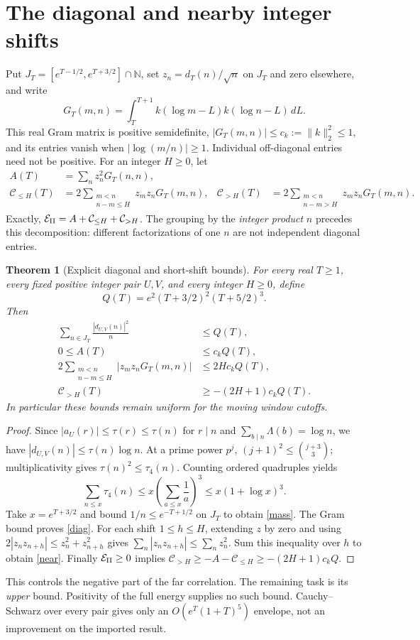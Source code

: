 \documentclass[11pt]{article}
\newtheorem{theorem}{Theorem}\newtheorem{lemma}{Lemma}\newtheorem{proposition}{Proposition}
\newcommand{\dd}{\,d}\newcommand{\E}{\mathcal E}\newcommand{\C}{\mathcal C}
\begin{document}
\section{The diagonal and nearby integer shifts}
Put $J_T=[e^{T-1/2},e^{T+3/2}]\cap\mathbb N$, set
$z_n=d_T(n)/\sqrt n$ on $J_T$ and zero elsewhere, and write
\[
 G_T(m,n)=\int_T^{T+1}k(\log m-L)k(\log n-L)\dd L.
\]
This real Gram matrix is positive semidefinite,
$|G_T(m,n)|\le c_k:=\|k\|_2^2\le1$, and its entries vanish when
$|\log(m/n)|\ge1$. Individual off-diagonal entries need not be positive.
For an integer $H\ge0$, let
\begin{align*}
 A(T)&=\sum_n z_n^2G_T(n,n),\\
 \C_{\le H}(T)&=2\sum_{\substack{m<n\\n-m\le H}}z_mz_nG_T(m,n),&
 \C_{>H}(T)&=2\sum_{\substack{m<n\\n-m>H}}z_mz_nG_T(m,n).
\end{align*}
Exactly, $\E_{\rm II}=A+\C_{\le H}+\C_{>H}$. The grouping by the
\emph{integer product} $n$ precedes this decomposition: different
factorizations of one $n$ are not independent diagonal entries.

\begin{theorem}[Explicit diagonal and short-shift bounds]\label{band}
For every real $T\ge1$, every fixed positive integer pair $U,V$, and
every integer $H\ge0$, define
\[
 Q(T)=e^2(T+3/2)^2(T+5/2)^3.
\]
Then
\begin{align}
 \sum_{n\in J_T}\frac{|d_{U,V}(n)|^2}{n}&\le Q(T),\label{mass}\\
 0\le A(T)&\le c_k Q(T),\label{diag}\\
 2\sum_{\substack{m<n\\n-m\le H}}|z_mz_nG_T(m,n)|
 &\le 2Hc_k Q(T),\label{near}\\
 \C_{>H}(T)&\ge-(2H+1)c_k Q(T).\label{lower}
\end{align}
In particular these bounds remain uniform for the moving window cutoffs.
\end{theorem}
\begin{proof}
Since $|a_U(r)|\le\tau(r)\le\tau(n)$ for $r\mid n$ and
$\sum_{b\mid n}\Lambda(b)=\log n$, we have
$|d_{U,V}(n)|\le\tau(n)\log n$. At a prime power $p^j$,
$(j+1)^2\le\binom{j+3}{3}$; multiplicativity gives
$\tau(n)^2\le\tau_4(n)$. Counting ordered quadruples yields
\[
 \sum_{n\le x}\tau_4(n)
 \le x\left(\sum_{a\le x}\frac1a\right)^3
 \le x(1+\log x)^3.
\]
Take $x=e^{T+3/2}$ and bound $1/n\le e^{-T+1/2}$ on $J_T$ to
obtain \eqref{mass}. The Gram bound proves \eqref{diag}.
For each shift $1\le h\le H$, extending $z$ by zero and using
$2|z_nz_{n+h}|\le z_n^2+z_{n+h}^2$ gives
$\sum_n|z_nz_{n+h}|\le\sum_nz_n^2$.
Sum this inequality over $h$ to obtain \eqref{near}.
Finally $\E_{\rm II}\ge0$ implies
$\C_{>H}\ge-A-\C_{\le H}\ge-(2H+1)c_kQ$.
\end{proof}
This controls the negative part of the far correlation. The remaining
task is its \emph{upper} bound. Positivity of the full energy supplies
no such bound. Cauchy--Schwarz over every pair gives only an
$O(e^T(1+T)^5)$ envelope, not an improvement on the imported result.
\end{document}
